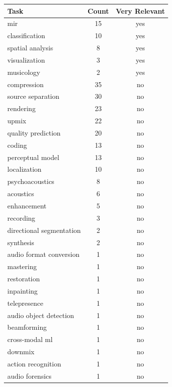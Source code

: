 \begin{tabular}{lcc}
\toprule
Task & Count & Very Relevant \\
\midrule
\gls{mir} & 15 & yes \\
classification & 10 & yes \\
spatial analysis & 8 & yes \\
visualization & 3 & yes \\
musicology & 2 & yes \\
\midrule
compression & 35 & no \\
source separation & 30 & no \\
rendering & 23 & no \\
upmix & 22 & no \\
quality prediction & 20 & no \\
coding & 13 & no \\
perceptual model & 13 & no \\
localization & 10 & no \\
psychoacoustics & 8 & no \\
acoustics & 6 & no \\
enhancement & 5 & no \\
recording & 3 & no \\
directional segmentation & 2 & no \\
synthesis & 2 & no \\
audio format conversion & 1 & no \\
mastering & 1 & no \\
restoration & 1 & no \\
inpainting & 1 & no \\
telepresence & 1 & no \\
audio object detection & 1 & no \\
beamforming & 1 & no \\
cross-modal \gls{ml} & 1 & no \\
downmix & 1 & no \\
action recognition & 1 & no \\
audio forensics & 1 & no \\
\bottomrule
\end{tabular}